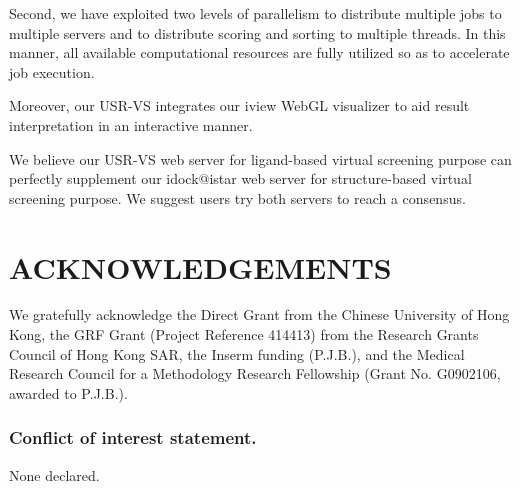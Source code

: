 \documentclass[a4,center,fleqn]{NAR}
\begin{document}
Second, we have exploited two levels of parallelism to distribute multiple jobs to multiple servers and to distribute scoring and sorting to multiple threads. In this manner, all available computational resources are fully utilized so as to accelerate job execution.

Moreover, our USR-VS integrates our iview \cite{1366} WebGL visualizer to aid result interpretation in an interactive manner.

We believe our USR-VS web server for ligand-based virtual screening purpose can perfectly supplement our idock@istar \cite{1362} web server for structure-based virtual screening purpose. We suggest users try both servers to reach a consensus.

\section{ACKNOWLEDGEMENTS}

We gratefully acknowledge the Direct Grant from the Chinese University of Hong Kong, the GRF Grant (Project Reference 414413) from the Research Grants Council of Hong Kong SAR, the Inserm funding (P.J.B.), and the Medical Research Council for a Methodology Research Fellowship (Grant No. G0902106, awarded to P.J.B.).

\subsubsection{Conflict of interest statement.} None declared.
\newpage

\end{document}
